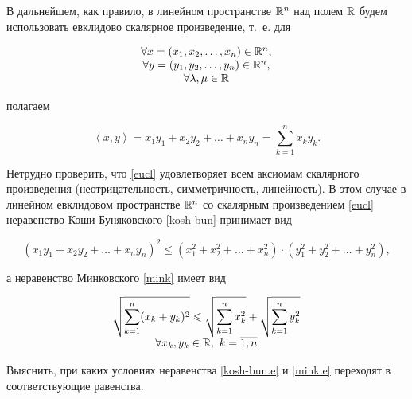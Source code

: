 \documentclass[../../main.tex]{subfiles}
\begin{document}
\begin{rem}
 В дальнейшем, как правило, в линейном пространстве 
 $\mathbb{R}^n$ над полем $\mathbb{R}$ будем 
 использовать евклидово скалярное произведение, т.~е. для

 \[
 \begin{array}{c}
  \forall x = (x_1, x_2, \dots, x_n) \in \mathbb{R}^n, \\
  \forall y = (y_1, y_2, \dots, y_n) \in \mathbb{R}^n, \\
  \forall \lambda, \mu \in \mathbb{R}
 \end{array}
 \]
 
 полагаем
 
 \begin{equation}
  \label{eucl}
  \left<x, y\right> = x_1y_1 + x_2y_2 + \dots + x_ny_n =
  \sum_{k=1}^n x_ky_k.
 \end{equation}

 Нетрудно проверить, что \eqref{eucl} удовлетворяет всем аксиомам 
 скалярного произведения (неотрицательность, симметричность, 
 линейность). В этом случае в линейном евклидовом пространстве
 $\mathbb{R}^n$ со скалярным произведением \eqref{eucl} неравенство
 Коши-Буняковского \eqref{kosh-bun} принимает вид
 
 \begin{equation}
  \label{kosh-bun.e}
  \left(x_1y_1 + x_2y_2 + \dots + x_ny_n\right)^2 \le
  \left(x_1^2 + x_2^2 + \dots + x_n^2\right)\cdot
  \left(y_1^2 + y_2^2 + \dots + y_n^2\right),
 \end{equation}
 
 а неравенство Минковского \eqref{mink} имеет вид
 
 \begin{equation}
  \label{mink.e}
  \begin{array}{c}
   \displaystyle
   \sqrt{\sum_{k=1}^n (x_k + y_k)^2} \leqslant
   \sqrt{\sum_{k=1}^n x_k^2} + \sqrt{\sum_{k=1}^n y_k^2} \\
   \forall x_k, y_k \in \mathbb{R},\ k = \overline{1, n}
  \end{array}
 \end{equation}
 
\end{rem}

\begin{exc}
 Выяснить, при каких условиях неравенства \eqref{kosh-bun.e} и 
 \eqref{mink.e} переходят в соответствующие равенства.
\end{exc}

\end{document}
